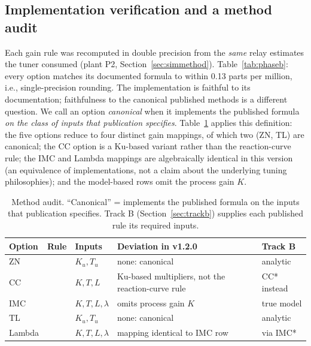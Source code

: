 \documentclass[10pt,twocolumn]{article}
\begin{document}
\subsection{Implementation verification and a method audit}
\label{sec:verify}

Each gain rule was recomputed in double precision from the \emph{same} relay estimates the tuner consumed (plant P2, Section~\ref{sec:simmethod}). Table~\ref{tab:phaseb}: every option matches its documented formula to within 0.13 parts per million, i.e., single-precision rounding. The implementation is faithful to its documentation; faithfulness to the canonical published methods is a different question. We call an option \emph{canonical} when it implements the published formula \emph{on the class of inputs that publication specifies}. Table~\ref{tab:audit} applies this definition: the five options reduce to four distinct gain mappings, of which two (ZN, TL) are canonical; the CC option is a Ku-based variant rather than the reaction-curve rule; the IMC and Lambda mappings are algebraically identical in this version (an equivalence of implementations, not a claim about the underlying tuning philosophies); and the model-based rows omit the process gain $K$.

\begin{table}[t]
\centering
\caption{Verification of emitted gains against independent double-precision recomputation from the same relay estimates ($K_u = 6.067$, $T_u = 20.0$ s, $\lambda = 0.5$ s, P2). Maximum relative deviation below 0.13 ppm per option.}
\label{tab:phaseb}
\scriptsize
\setlength{\tabcolsep}{2.5pt}

\end{table}

\begin{table}[t]
\centering
\caption{Method audit. ``Canonical'' = implements the published formula on the inputs that publication specifies. Track B (Section~\ref{sec:trackb}) supplies each published rule its required inputs.}
\label{tab:audit}
\scriptsize
\setlength{\tabcolsep}{2pt}
\begin{tabular}{@{}lp{0.85cm}p{1.2cm}p{2.35cm}p{1.3cm}@{}}
\toprule
Option & Rule & Inputs & Deviation in v1.2.0 & Track B \\
\midrule
ZN & \cite{ziegler1942} & $K_u, T_u$ & none: canonical & analytic \\
CC & \cite{cohen1953} & $K, T, L$ & Ku-based multipliers, not the reaction-curve rule & CC* instead \\
IMC & \cite{rivera1986} & $K, T, L, \lambda$ & omits process gain $K$ & true model \\
TL & \cite{tyreus1992} & $K_u, T_u$ & none: canonical & analytic \\
Lambda & \cite{skogestad2003} & $K, T, L, \lambda$ & mapping identical to IMC row & via IMC* \\
\bottomrule
\end{tabular}
\end{table}
\end{document}
